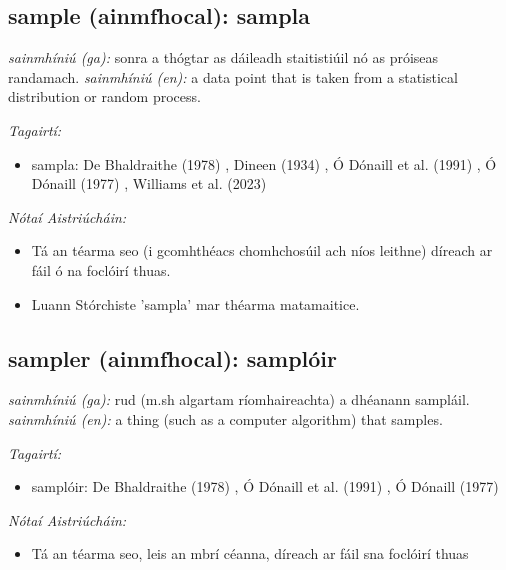 \documentclass{article}
\begin{document}
\subsection*{sample (ainmfhocal): sampla} 
 \noindent \textit{sainmhíniú (ga):} sonra a thógtar as dáileadh staitistiúil nó as próiseas randamach.
\newline\newline
 \noindent \textit{sainmhíniú (en):} a data point that is taken from a statistical distribution or random process.
\newline

 \noindent \textit{Tagairtí:}
\begin{itemize}
	\item sampla: De Bhaldraithe (1978) \cite{de-bhaldraithe}, Dineen (1934) \cite{dineen}, Ó Dónaill et al. (1991) \cite{focloir-beag}, Ó Dónaill (1977) \cite{odonaill}, Williams et al. (2023) \cite{storchiste}
\end{itemize}

 \noindent \textit{Nótaí Aistriúcháin:}
\begin{itemize}
	\item Tá an téarma seo (i gcomhthéacs chomhchosúil ach níos leithne) díreach ar fáil ó na foclóirí thuas.
	\item Luann Stórchiste 'sampla' mar théarma matamaitice.
\end{itemize}


\subsection*{sampler (ainmfhocal): samplóir} 
 \noindent \textit{sainmhíniú (ga):} rud (m.sh algartam ríomhaireachta) a dhéanann sampláil.
\newline\newline
 \noindent \textit{sainmhíniú (en):} a thing (such as a computer algorithm) that samples.
\newline

 \noindent \textit{Tagairtí:}
\begin{itemize}
	\item samplóir: De Bhaldraithe (1978) \cite{de-bhaldraithe}, Ó Dónaill et al. (1991) \cite{focloir-beag}, Ó Dónaill (1977) \cite{odonaill}
\end{itemize}

 \noindent \textit{Nótaí Aistriúcháin:}
\begin{itemize}
	\item Tá an téarma seo, leis an mbrí céanna, díreach ar fáil sna foclóirí thuas
\end{itemize}
\end{document}
